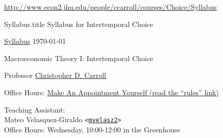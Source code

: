 \documentclass{\econtex}\newcommand{\texname}{Syllabus}
\begin{document}
\large
\begin{center}{{\tiny \url{http://www.econ2.jhu.edu/people/ccarroll/courses/Choice/Syllabus}}}\end{center}


\begin{verbatimwrite}{\texname.title}
Syllabus for Intertemporal Choice
\end{verbatimwrite}

\thispagestyle{empty}

\newenvironment{blockpar}{\par\begin{minipage}{\textwidth}
\setlength{\parskip}{.5\baselineskip plus 1pt minus 1pt}}{\end{minipage}}

\pagestyle{plain}
\thispagestyle{empty}

\begin{center}
{\tiny \href{http://www.econ2.jhu.edu/people/ccarroll/courses/Choice/Syllabus.pdf}{\texname} \hfill \today}


{\LARGE Macroeconomic Theory I: Intertemporal Choice}
\medskip\medskip
\medskip\medskip

\smallskip


Professor \href{http://www.econ2.jhu.edu/people/ccarroll}{Christopher D. Carroll}

\medskip

\medskip\medskip
Office Hours: \href{https://calendar.google.com/calendar/selfsched?sstoken=UUNxMjFfNUtvakNSfGRlZmF1bHR8NjZhZDA0NmI3YmE5N2Y5N2Y3YjE2MzI5ZDg5YTYwYjQ}{Make An Appointment Yourself (read the ``rules'' link)}

\medskip\medskip\medskip
\small
Teaching Assistant:  \\
Mateo Velasquez-Giraldo \texttt{<\href{mailto:mvelasq2}{\texttt{mvelasz2}}>}
\\ Office Hours: Wednesday, 10:00-12:00 in the Greenhouse
\normalsize
\medskip

\end{center}
\end{document}
